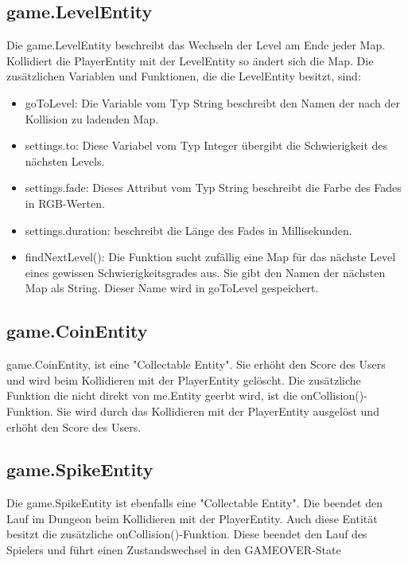 \subsection{game.LevelEntity}
\label{LevelEntity}
Die game.LevelEntity beschreibt das Wechseln der Level am Ende jeder Map. Kollidiert die PlayerEntity mit der LevelEntity so \"andert sich die Map.
Die zus\"atzlichen Variablen und Funktionen, die die LevelEntity besitzt, sind:
\begin{itemize} 
	\item goToLevel: Die Variable vom Typ String beschreibt den Namen der nach der Kollision zu ladenden Map.
	\item settings.to: Diese Variabel vom Typ Integer \"ubergibt die Schwierigkeit des n\"achsten Levels.
	\item settings.fade: Dieses Attribut vom Typ String beschreibt die Farbe des Fades in RGB-Werten.
	\item settings.duration: beschreibt die L\"ange des Fades in Millisekunden.

  	\item findNextLevel(): Die Funktion sucht zuf\"allig eine Map f\"ur das n\"achste Level eines gewissen Schwierigkeitsgrades aus. Sie gibt den Namen 
		der n\"achsten Map als String. Dieser Name wird in goToLevel gespeichert.
\end{itemize}    

\subsection{game.CoinEntity}
\label{CoinEntity}                               
game.CoinEntity, ist eine "Collectable Entity". Sie erh\"oht den Score des Users und wird beim Kollidieren mit der PlayerEntity gel\"oscht.
Die zus\"atzliche Funktion die nicht direkt von me.Entity geerbt wird, ist die onCollision()-Funktion. Sie wird durch das Kollidieren mit der PlayerEntity
 ausgel\"ost und erh\"oht den Score des Users.

\newpage
\subsection{game.SpikeEntity}
\label{SpikeEntity}                            
Die game.SpikeEntity ist ebenfalls eine "Collectable Entity". Die beendet den Lauf im Dungeon beim Kollidieren mit der PlayerEntity.
Auch diese Entit\"at besitzt die zus\"atzliche onCollision()-Funktion. Diese beendet den Lauf des Spielers und f\"uhrt einen Zustandswechsel in
den GAMEOVER-State

